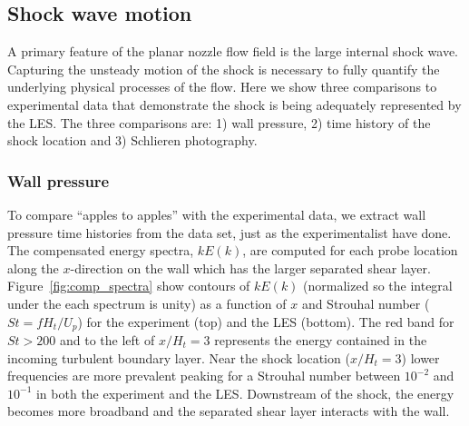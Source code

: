 \documentclass[]{aiaa-tc}%
\begin{document}




\clearpage
\subsection{Shock wave motion}

A primary feature of the planar nozzle flow field is the large internal shock wave.  Capturing the unsteady motion of the shock is necessary to fully quantify the underlying physical processes of the flow.  Here we show three comparisons to experimental data that demonstrate the shock is being adequately represented by the LES.  The three comparisons are: 1) wall pressure, 2) time history of the shock location and 3) Schlieren photography.



\subsubsection{Wall pressure}

To compare ``apples to apples'' with the experimental data, we extract wall pressure time histories from the data set, just as the experimentalist have done.  The compensated energy spectra, $kE(k)$, are computed for each probe location along the $x$-direction on the wall which has the larger separated shear layer.  Figure~\ref{fig:comp_spectra} show contours of $kE(k)$ (normalized so the integral under the each spectrum is unity) as a function of $x$ and Strouhal number ($St=fH_t/U_p$) for the experiment (top) and the LES (bottom).  The red band for $St>200$ and to the left of $x/H_t=3$ represents the energy contained in the incoming turbulent boundary layer.  Near the shock location ($x/H_t=3$) lower frequencies are more prevalent peaking for a Strouhal number between $10^{-2}$ and $10^{-1}$ in both the experiment and the LES.  Downstream of the shock, the energy becomes more broadband and the separated shear layer interacts with the wall.  
\end{document}
